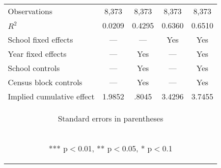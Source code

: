 \documentclass[]{article}
\begin{document}
\begin{center}
\begin{tabular}{lcccc}
Observations & 8,373 & 8,373 & 8,373 & 8,373 \\
$R^2$ & 0.0209 & 0.4295 & 0.6360 & 0.6510 \\
School fixed effects & --- & --- & Yes & Yes \\
Year fixed effects & --- & Yes & --- & Yes \\
School controls & --- & Yes & --- & Yes \\
Census block controls & --- & Yes & --- & Yes \\
 Implied cumulative effect & 1.9852 & .8045 & 3.4296 & 3.7455 \\ \hline
\multicolumn{5}{c}{\begin{footnotesize} Standard errors in parentheses\end{footnotesize}} \\
\multicolumn{5}{c}{\begin{footnotesize} *** p$<$0.01, ** p$<$0.05, * p$<$0.1\end{footnotesize}} \\
\end{tabular}
\end{center}
\end{document}
